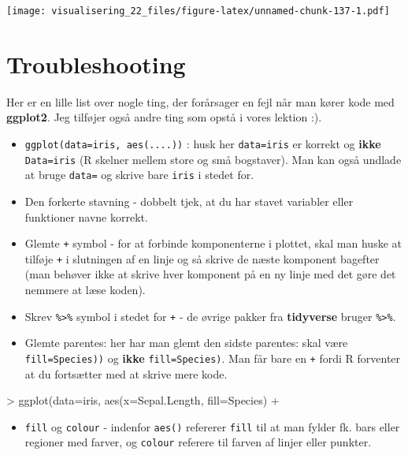 \documentclass[
]{book}
\newenvironment{Shaded}{\begin{snugshade}}{\end{snugshade}}
\newcommand{\AttributeTok}[1]{\textcolor[rgb]{0.77,0.63,0.00}{#1}}
\newcommand{\FunctionTok}[1]{\textcolor[rgb]{0.00,0.00,0.00}{#1}}
\newcommand{\NormalTok}[1]{#1}
\newcommand{\SpecialCharTok}[1]{\textcolor[rgb]{0.00,0.00,0.00}{#1}}
\providecommand{\tightlist}{%
  \setlength{\itemsep}{0pt}\setlength{\parskip}{0pt}}
\begin{document}
\texttt{[image: visualisering\_22\_files/figure-latex/unnamed-chunk-137-1.pdf]}

\hypertarget{troubleshooting}{%
\section{Troubleshooting}\label{troubleshooting}}

Her er en lille list over nogle ting, der forårsager en fejl når man kører kode med \textbf{ggplot2}. Jeg tilføjer også andre ting som opstå i vores lektion :).

\begin{itemize}
\item
  \texttt{ggplot(data=iris,\ aes(....))} : husk her \texttt{data=iris} er korrekt og \textbf{ikke} \texttt{Data=iris} (R skelner mellem store og små bogstaver). Man kan også undlade at bruge \texttt{data=} og skrive bare \texttt{iris} i stedet for.
\item
  Den forkerte stavning - dobbelt tjek, at du har stavet variabler eller funktioner navne korrekt.
\item
  Glemte \texttt{+} symbol - for at forbinde komponenterne i plottet, skal man huske at tilføje \texttt{+} i slutningen af en linje og så skrive de næste komponent bagefter (man behøver ikke at skrive hver komponent på en ny linje med det gøre det nemmere at læse koden).
\item
  Skrev \texttt{\%\textgreater{}\%} symbol i stedet for \texttt{+} - de øvrige pakker fra \textbf{tidyverse} bruger \texttt{\%\textgreater{}\%}.
\item
  Glemte parentes: her har man glemt den sidste parentes: skal være \texttt{fill=Species))} og \textbf{ikke} \texttt{fill=Species)}. Man får bare en \texttt{+} fordi R forventer at du fortsætter med at skrive mere kode.
\end{itemize}

\begin{Shaded}
\begin{Highlighting}[]
\SpecialCharTok{\textgreater{}} \FunctionTok{ggplot}\NormalTok{(}\AttributeTok{data=}\NormalTok{iris, }\FunctionTok{aes}\NormalTok{(}\AttributeTok{x=}\NormalTok{Sepal.Length, }\AttributeTok{fill=}\NormalTok{Species)}
\SpecialCharTok{+} 
\end{Highlighting}
\end{Shaded}

\begin{itemize}
\tightlist
\item
  \texttt{fill} og \texttt{colour} - indenfor \texttt{aes()} refererer \texttt{fill} til at man fylder fk. bars eller regioner med farver, og \texttt{colour} referere til farven af linjer eller punkter.
\end{itemize}
\end{document}
